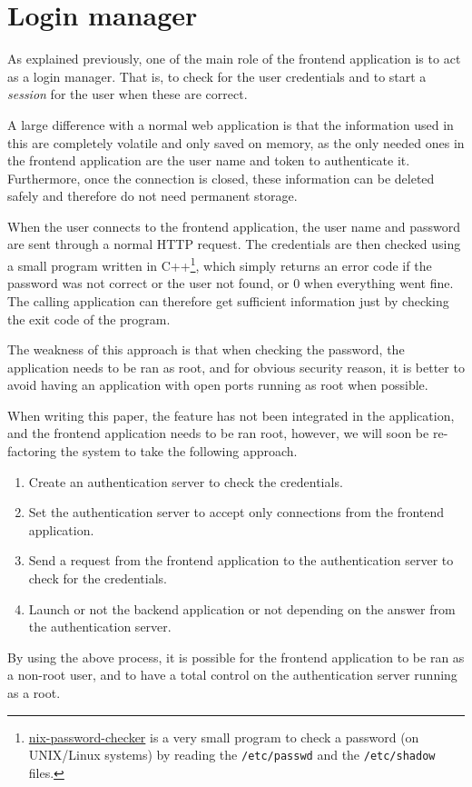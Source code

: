 \section{Login manager}
As explained previously, one of the main role of the frontend application is to act 
as a login manager. That is, to check for the user credentials and to start a 
\emph{session} for the user when these are correct.

A large difference with a normal web application is that the information used 
in this are completely volatile and only saved on memory, as the only 
needed ones in the frontend application are the user name and token to 
authenticate it. Furthermore, once the connection is closed, these information 
can be deleted safely and therefore do not need permanent storage.

When the user connects to the frontend application, the user name and password are sent through a normal 
HTTP request. The credentials are then checked using a small program written 
in C++\footnote{\href{https://github.com/tuvistavie/nix-password-checker}{nix-password-checker} 
  is a very small program to check a password (on UNIX/Linux systems) by reading
  the \lstinline{/etc/passwd} and the \lstinline{/etc/shadow} files.}, which 
simply returns an error code if the password was not correct or the user not found, 
or $0$ when everything went fine. The calling application can therefore get sufficient 
information just by checking the exit code of the program.

The weakness of this approach is that when checking the password, the application needs to be 
ran as root, and for obvious security reason, it is better to avoid having an application with 
open ports running as root when possible. 

When writing this paper, the feature has not been integrated in the application, and 
the frontend application needs to be ran root, however, we will soon be re-factoring 
the system to take the following approach.

\begin{enumerate}
\item Create an authentication server to check the credentials.
\item Set the authentication server to accept only connections from the frontend application.
\item Send a request from the frontend application to the authentication server 
  to check for the credentials.
\item Launch or not the backend application or not depending on the answer from the 
  authentication server.
\end{enumerate}

By using the above process, it is possible for the frontend application to be ran as a non-root
user, and to have a total control on the authentication server running as a root.
